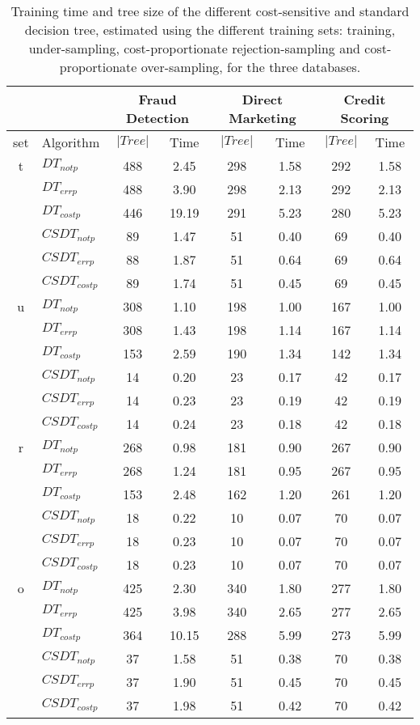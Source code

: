\begin{table}
  \centering
  \footnotesize
  \begin{tabular}{|c|l|c c|c c|c c|}
    \cline{3-8}
    \multicolumn{2}{c}{}& \multicolumn{2}{|c|}{Fraud Detection} & \multicolumn{2}{|c|}{Direct 
    Marketing} 
    & \multicolumn{2}{|c|}{Credit Scoring}\\
    \hline
    set&Algorithm & $\vert Tree\vert$ & Time& $\vert Tree\vert$ & Time& $\vert Tree\vert$ & Time\\
    \hline
    t &$DT_{not p}$&488&2.45&298&1.58&292&1.58\\
    &$DT_{err p}$&488&3.90&298&2.13&292&2.13\\
    &$DT_{cost p}$&446&19.19&291&5.23&280&5.23\\
    &$CSDT_{not p}$&89&1.47&51&0.40&69&0.40\\
    &$CSDT_{err p}$&88&1.87&51&0.64&69&0.64\\
    &$CSDT_{cost p}$&89&1.74&51&0.45&69&0.45\\
    \hline
    u &$DT_{not p}$&308&1.10&198&1.00&167&1.00\\
    &$DT_{err p}$&308&1.43&198&1.14&167&1.14\\
    &$DT_{cost p}$&153&2.59&190&1.34&142&1.34\\
    &$CSDT_{not p}$&14&0.20&23&0.17&42&0.17\\
    &$CSDT_{err p}$&14&0.23&23&0.19&42&0.19\\
    &$CSDT_{cost p}$&14&0.24&23&0.18&42&0.18\\
    \hline
    r &$DT_{not p}$&268&0.98&181&0.90&267&0.90\\
    &$DT_{err p}$&268&1.24&181&0.95&267&0.95\\
    &$DT_{cost p}$&153&2.48&162&1.20&261&1.20\\
    &$CSDT_{not p}$&18&0.22&10&0.07&70&0.07\\
    &$CSDT_{err p}$&18&0.23&10&0.07&70&0.07\\
    &$CSDT_{cost p}$&18&0.23&10&0.07&70&0.07\\
    \hline
    o &$DT_{not p}$&425&2.30&340&1.80&277&1.80\\
    &$DT_{err p}$&425&3.98&340&2.65&277&2.65\\
    &$DT_{cost p}$&364&10.15&288&5.99&273&5.99\\
    &$CSDT_{not p}$&37&1.58&51&0.38&70&0.38\\
    &$CSDT_{err p}$&37&1.90&51&0.45&70&0.45\\
    &$CSDT_{cost p}$&37&1.98&51&0.42&70&0.42\\
    \hline
  \end{tabular} 
  \caption{Training time and tree size of the different cost-sensitive and standard decision 
  tree, estimated using the different training sets: training, under-sampling, 
  cost-proportionate rejection-sampling and cost-proportionate over-sampling, for the three 
  databases.}
  \label{tab:8:2}
\end{table}

